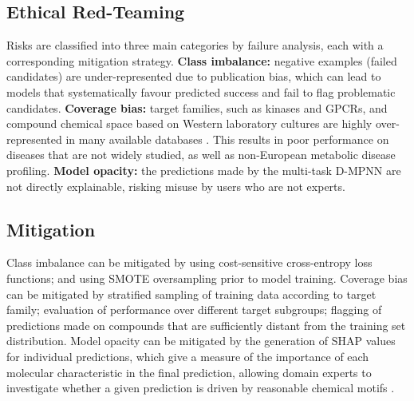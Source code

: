 \documentclass[conference]{IEEEtran}
\begin{document}
\subsection{Ethical Red-Teaming}
 
Risks are classified into three main categories by failure analysis, each with a corresponding mitigation strategy. \textbf{Class imbalance:} negative examples (failed candidates) are under-represented due to publication bias, which can lead to models that systematically favour predicted success and fail to flag problematic candidates. \textbf{Coverage bias:} target families, such as kinases and GPCRs, and compound chemical space based on Western laboratory cultures are highly over-represented in many available databases \cite{b10}. This results in poor performance on diseases that are not widely studied, as well as non-European metabolic disease profiling. \textbf{Model opacity:} the predictions made by the multi-task D-MPNN are not directly explainable, risking misuse by users who are not experts. 

\subsection{Mitigation}
Class imbalance can be mitigated by using cost-sensitive cross-entropy loss functions; and using SMOTE oversampling prior to model training. Coverage bias can be mitigated by stratified sampling of training data according to target family; evaluation of performance over different target subgroups; flagging of predictions made on compounds that are sufficiently distant from the training set distribution. Model opacity can be mitigated by the generation of SHAP values for individual predictions, which give a measure of the importance of each molecular characteristic in the final prediction, allowing domain experts to investigate whether a given prediction is driven by reasonable chemical motifs \cite{b7}.
\end{document}

